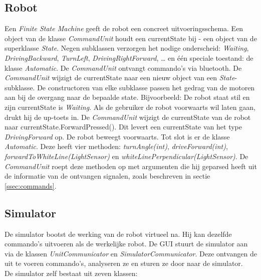 \documentclass[tt3]{penoverslag}
\begin{document}
\subsection{Robot} %
\label{ssec:robot}
Een \textit{Finite State Machine} geeft de robot een concreet uitvoeringsschema. Een object van de klasse \textit{CommandUnit} houdt een currentState bij - een object van de superklasse \textit{State}. Negen subklassen verzorgen het nodige onderscheid: \textit{Waiting}, \textit{DrivingBackward}, \textit{TurnLeft}, \textit{DrivingRightForward}, …  en \'e\'en speciale toestand: de klasse \textit{Automatic}. De \textit{CommandUnit} ontvangt commando's via bluetooth. De \textit{CommandUnit} wijzigt de currentState naar een nieuw object van een \textit{State}-subklasse. De constructoren van elke subklasse passen het gedrag van de motoren aan bij de overgang naar de bepaalde state.
Bijvoorbeeld: De robot staat stil en zijn currentState is \textit{Waiting}.
Als de gebruiker de robot voorwaarts wil laten gaan, drukt hij de up-toets in. De \textit{CommandUnit} wijzigt de currentState van de robot naar currentState.ForwardPressed(). Dit levert een currentState van het type \textit{DrivingForward} op. De robot beweegt voorwaarts.
Tot slot is er de klasse \textit{Automatic}. Deze heeft vier methoden: \textit{turnAngle(int)}, \textit{driveForward(int)}, \textit{forwardToWhiteLine(LightSensor)} en \textit{whiteLinePerpendicular(LightSensor)}. De \textit{CommandUnit} roept deze methoden op met argumenten die hij geparsed heeft uit de informatie van de ontvangen signalen, zoals beschreven in sectie \ref{ssec:commands}.

\subsection{Simulator} %
\label{ssec:simulator}
De simulator bootst de werking van de robot virtueel na. Hij kan dezelfde commando's uitvoeren als de werkelijke robot. De GUI stuurt de simulator aan via de klassen \textit{UnitCommunicator} en \textit{SimulatorCommunicator}. Deze ontvangen de uit te voeren commando's, analyseren ze en sturen ze door naar de simulator.
\\
De simulator zelf bestaat uit zeven klassen:
\end{document}
